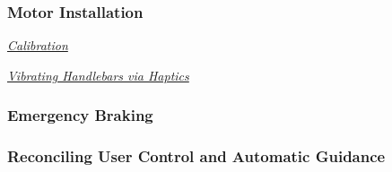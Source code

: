 \subsubsection{Motor Installation}
\noindent \underline{\textit{Calibration}}

\noindent \underline{\textit{Vibrating Handlebars via Haptics}}

\subsubsection{Emergency Braking}

\subsubsection{Reconciling User Control and Automatic Guidance}
